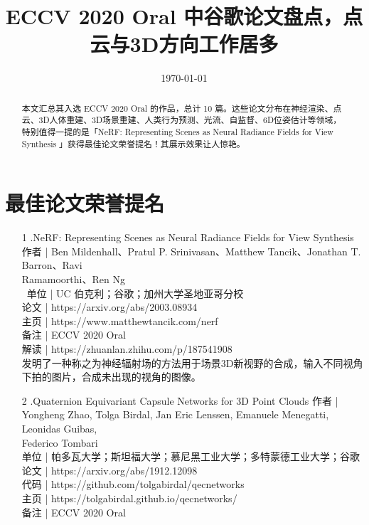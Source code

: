 \documentclass{article}
\title{ECCV 2020 Oral 中谷歌论文盘点，点云与3D方向工作居多}
\date{\today}
\begin{document}
	\maketitle
	\begin{abstract}
		本文汇总其入选 ECCV 2020 Oral 的作品，总计 10 篇。这些论文分布在神经渲染、点云、3D人体重建、3D场景重建、人类行为预测、光流、自监督、6D位姿估计等领域，特别值得一提的是「NeRF: Representing Scenes as Neural Radiance Fields for View Synthesis 」获得最佳论文荣誉提名！其展示效果让人惊艳。
	\end{abstract}
	\section*{最佳论文荣誉提名}
		
	   \begin{itemize}%
	   	\item
	   	[1].NeRF: Representing Scenes as Neural Radiance Fields for View Synthesis\\
	   	作者 | Ben Mildenhall、Pratul P. Srinivasan、Matthew Tancik、Jonathan T. Barron、Ravi\\ Ramamoorthi、Ren Ng\\\
	   	单位 | UC 伯克利；谷歌；加州大学圣地亚哥分校\\
	   	论文 | https://arxiv.org/abs/2003.08934\\
	   	主页 | https://www.matthewtancik.com/nerf\\
	   	备注 | ECCV 2020 Oral\\
	   	解读 | https://zhuanlan.zhihu.com/p/187541908\\
	   	
	   	发明了一种称之为神经辐射场的方法用于场景3D新视野的合成，输入不同视角下拍的图片，合成未出现的视角的图像。\\
	   	\item 
	   	[2].Quaternion Equivariant Capsule Networks for 3D Point Clouds
	   	作者 | Yongheng Zhao, Tolga Birdal, Jan Eric Lenssen, Emanuele Menegatti, Leonidas Guibas,\\ Federico Tombari\\
	   	单位 | 帕多瓦大学；斯坦福大学；慕尼黑工业大学；多特蒙德工业大学；谷歌\\
	   	论文 | https://arxiv.org/abs/1912.12098\\
	   	代码 | https://github.com/tolgabirdal/qecnetworks\\
	   	主页 | https://tolgabirdal.github.io/qecnetworks/\\
	   	备注 | ECCV 2020 Oral \\
	   	

\end{itemize}
\end{document}
